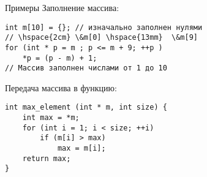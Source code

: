 \documentclass{beamer}
\begin{document}
\begin{frame}[fragile]{Примеры}
Заполнение массива:
\begin{lstlisting}
int m[10] = {}; // изначально заполнен нулями
// \hspace{2cm} \&m[0] \hspace{13mm}  \&m[9]
for (int * p = m ; p <= m + 9; ++p )
    *p = (p - m) + 1;    
// Массив заполнен числами от 1 до 10
\end{lstlisting}
Передача массива в функцию:
\begin{lstlisting} 
int max_element (int * m, int size) {
    int max = *m; 
    for (int i = 1; i < size; ++i)
        if (m[i] > max)
            max = m[i];
    return max;
}
\end{lstlisting}
\end{frame}
\end{document}
